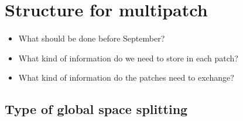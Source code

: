 \documentclass[presentation.tex]{subfiles}
\begin{document}
\maketitle


\tableofcontents

\newpage

\section{Structure for multipatch}
\paragraph{}
\begin{itemize}
	\item What should be done before September?
	\item What kind of information do we need to store in each patch? 
	\item What kind of information do the patches need to exchange? 
\end{itemize}


\subsection{Type of global space splitting}
\paragraph{}
\end{document}
